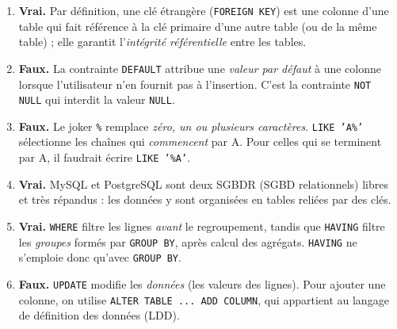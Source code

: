 \documentclass[11pt]{article}
\newcommand{\cle}[1]{{\popxbold\color{popdark}#1}}
\begin{document}
\begin{corrige}
\begin{enumerate}
\item \textbf{Vrai.} Par définition, une \cle{clé étrangère} (\texttt{FOREIGN KEY}) est une colonne d'une table qui fait référence à la clé primaire d'une autre table (ou de la même table) ; elle garantit l'\emph{intégrité référentielle} entre les tables.
\item \textbf{Faux.} La contrainte \texttt{DEFAULT} attribue une \emph{valeur par défaut} à une colonne lorsque l'utilisateur n'en fournit pas à l'insertion. C'est la contrainte \texttt{NOT NULL} qui interdit la valeur \texttt{NULL}.
\item \textbf{Faux.} Le joker \texttt{\%} remplace \emph{zéro, un ou plusieurs caractères}. \texttt{LIKE 'A\%'} sélectionne les chaînes qui \emph{commencent} par A. Pour celles qui se terminent par A, il faudrait écrire \texttt{LIKE '\%A'}.
\item \textbf{Vrai.} MySQL et PostgreSQL sont deux \cle{SGBDR} (SGBD relationnels) libres et très répandus : les données y sont organisées en tables reliées par des clés.
\item \textbf{Vrai.} \texttt{WHERE} filtre les lignes \emph{avant} le regroupement, tandis que \texttt{HAVING} filtre les \emph{groupes} formés par \texttt{GROUP BY}, après calcul des agrégats. \texttt{HAVING} ne s'emploie donc qu'avec \texttt{GROUP BY}.
\item \textbf{Faux.} \texttt{UPDATE} modifie les \emph{données} (les valeurs des lignes). Pour ajouter une colonne, on utilise \texttt{ALTER TABLE ... ADD COLUMN}, qui appartient au langage de définition des données (LDD).
\end{enumerate}
\end{corrige}
\end{document}
